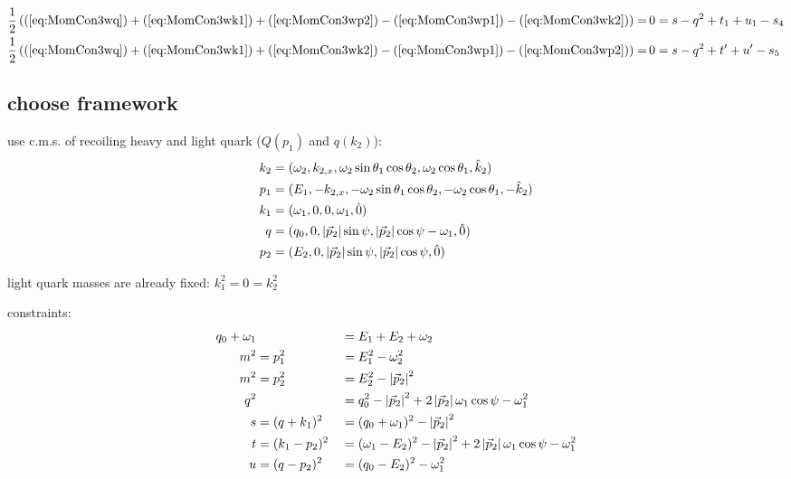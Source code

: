 \begin{align}
\frac 1 2 \left((\ref{eq:MomCon3wq}) + (\ref{eq:MomCon3wk1}) + (\ref{eq:MomCon3wp2}) - (\ref{eq:MomCon3wp1}) - (\ref{eq:MomCon3wk2})\right)=&\,0= s - q^2 + t_1 + u_1 - s_4\\
\frac 1 2 \left((\ref{eq:MomCon3wq}) + (\ref{eq:MomCon3wk1}) + (\ref{eq:MomCon3wk2}) - (\ref{eq:MomCon3wp1}) - (\ref{eq:MomCon3wp2})\right)=&\,0= s - q^2 + t' + u' - s_5 \label{eq:MonCon3s5up}
\end{align}

\subsection{choose framework}
use c.m.s. of recoiling heavy and light quark ($Q(p_1)$ and $q(k_2)$):
\begin{align}
k_2 &= (\omega_2,k_{2,x},\omega_2\sin\theta_1\cos\theta_2,\omega_2\cos\theta_1, \hat k_2)\\
p_1 &= (E_1,-k_{2,x},-\omega_2\sin\theta_1\cos\theta_2,-\omega_2\cos\theta_1, -\hat k_2)\\
k_1 &= (\omega_1,0,0,\omega_1, \hat 0)\\
q &= (q_0,0,\left|\vec p_2\right|\sin\psi,\left|\vec p_2\right|\cos\psi-\omega_1, \hat 0)\\
p_2 &= (E_2,0,\left|\vec p_2\right|\sin\psi,\left|\vec p_2\right|\cos\psi, \hat 0)
\end{align}

light quark masses are already fixed: $k_1^2 = 0 = k_2^2$

constraints:
\begin{align}
q_0+\omega_1 & &&=E_1+E_2+\omega_2 \label{eq:PSConMomCon}\\
m^2 &= p_1^2 &&= E_1^2 - \omega_2^2 \label{eq:PSConp1}\\
m^2 &= p_2^2 &&= E_2^2 - \left|\vec p_2\right|^2 \label{eq:PSConp2} \\
q^2 & &&= q_0^2 - \left|\vec p_2\right|^2 + 2\left|\vec p_2\right|\omega_1\cos\psi-\omega_1^2 \label{eq:PSConq}\\
s &= (q+k_1)^2 &&= (q_0+\omega_1)^2 - \left|\vec p_2\right|^2 \label{eq:PSCons}\\
t &= (k_1-p_2)^2 &&= (\omega_1-E_2)^2-\left|\vec p_2\right|^2+2\left|\vec p_2\right|\omega_1\cos\psi-\omega_1^2 \label{eq:PSCont}\\
u &= (q-p_2)^2 &&= (q_0-E_2)^2 - \omega_1^2 \label{eq:PSConu}
\end{align}

